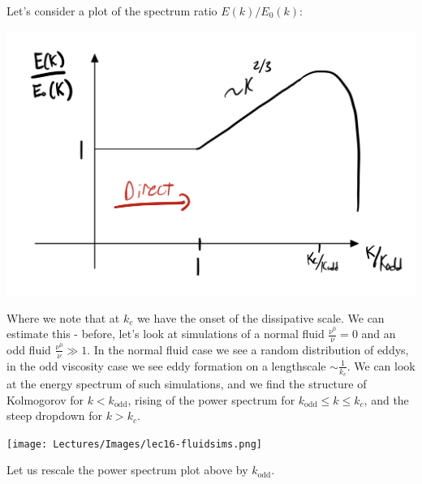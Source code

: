 Let's consider a plot of the spectrum ratio $E(k)/E_0(k)$:

\begin{center}
    \includegraphics[scale=0.35]{Lectures/Images/lec16-sketch.png}
\end{center}

Where we note that at $k_c$ we have the onset of the dissipative scale. We can estimate this - before, let's look at simulations of a normal fluid $\frac{\nu^0}{\nu} = 0$ and an odd fluid $\frac{\nu^0}{\nu} \gg 1$. In the normal fluid case we see a random distribution of eddys, in the odd viscosity case we see eddy formation on a lengthscale $\sim \frac{1}{k_c}$. We can look at the energy spectrum of such simulations, and we find the structure of Kolmogorov for $k < k_{\text{odd}}$, rising of the power spectrum for $k_{\text{odd}} \leq k \leq k_c$, and the steep dropdown for $k > k_c$.

\begin{center}
    \texttt{[image: Lectures/Images/lec16-fluidsims.png]}
\end{center}


Let us rescale the power spectrum plot above by $k_{\text{odd}}$.

